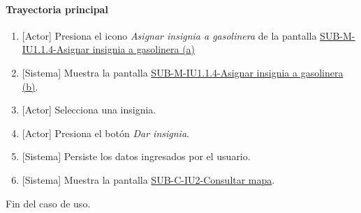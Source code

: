 \paragraph{Trayectoria principal}
	\begin{enumerate}
		\item {[Actor]} Presiona el icono \textit{Asignar insignia a gasolinera} de la pantalla \hyperref[fig:sub-m-1.1.4.a]{SUB-M-IU1.1.4-Asignar insignia a gasolinera (a)}
		\item {[Sistema]} Muestra la pantalla \hyperref[fig:sub-m-1.1.2.a]{SUB-M-IU1.1.4-Asignar insignia a gasolinera (b)}.
		\item {[Actor]} Selecciona una insignia.
		\item {[Actor]} Presiona el botón \textit{Dar insignia}.
		\item {[Sistema]} Persiste los datos ingresados por el usuario.
		\item {[Sistema]} Muestra la pantalla \hyperref[fig:sub-c-iu2]{SUB-C-IU2-Consultar mapa}.
	\end{enumerate}
	Fin del caso de uso.